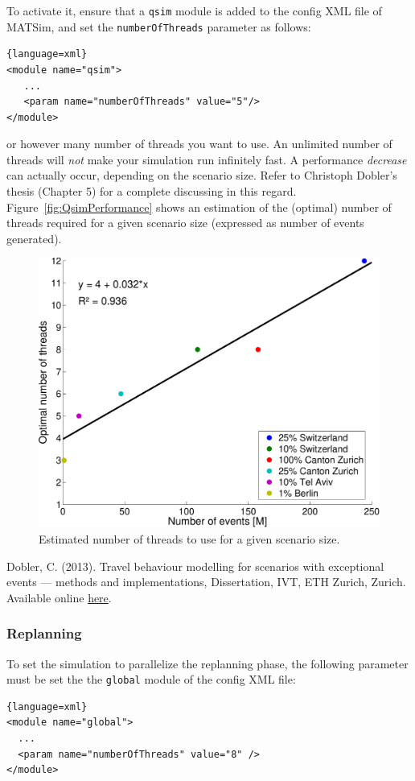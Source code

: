 To activate it, ensure that a \texttt{qsim} module is added to the config XML file of MATSim, and set the \texttt{numberOfThreads} parameter as follows:
\begin{lstlisting}{language=xml}
<module name="qsim">
   ...
   <param name="numberOfThreads" value="5"/>
</module>
\end{lstlisting}
or however many number of threads you want to use. An unlimited number of threads will \emph{not} make your simulation run infinitely fast. A performance \emph{decrease} can actually occur, depending on the scenario size. Refer to Christoph Dobler's thesis (Chapter 5) for a complete discussing in this regard. Figure~\ref{fig:QsimPerformance} shows an estimation of the (optimal) number of threads required for a given scenario size (expressed as number of events generated).
\begin{figure}[h]
\centering
\includegraphics[width=0.6\linewidth]{figures/benchmarks/EventsVsSpeedUp}
\caption{Estimated number of threads to use for a given scenario size.} 
\label{fig:QsimPerformance}
\label{figureLabel}
\end{figure}

Dobler, C. (2013). Travel behaviour modelling for scenarios with exceptional events --- methods and implementations, Dissertation, IVT, ETH Zurich, Zurich. Available online \href{http://e-collection.library.ethz.ch/view/eth:7633}{here}.

\subsubsection{Replanning}
To set the simulation to parallelize the replanning phase, the following parameter must be set the the \texttt{global} module of the config XML file:
\begin{lstlisting}{language=xml}
<module name="global">
  ...
  <param name="numberOfThreads" value="8" />
</module>
\end{lstlisting}

